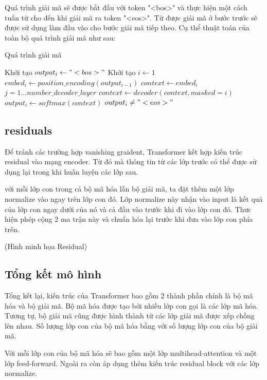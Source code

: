 Quá trình giải mã sẽ được bắt đầu với token "<bos>" và thực hiện một cách tuần từ cho đến khi giải mã ra token "<eos>". Từ được giải mã ở bước trước sẽ được sử dụng làm đầu vào cho bước giải mã tiếp theo. Cụ thể thuật toán của toàn bộ quá trình giải mã như sau:

\begin{algorithm}[H]
    \caption{Quá trình giải mã}
    \begin{algorithmic}[1]
		\State Khởi tạo $output_i \gets "<bos>"$
		\State Khởi tạo $i \gets 1$
		\Do
			\State $embed_i \gets position\_encoding(output_{i-1})$
			\State $context \gets embed_i$
			\For $j = 1...number\_decoder\_layer$
				\State $context \gets decoder(context, masked = i)$
			\EndFor
			\State $output_i \gets softmax(context)$
		\doWhile $output_i \neq "<eos>"$
    \end{algorithmic}
\end{algorithm}


\subsection{residuals}
Để tránh các trường hợp vanishing graident, Transformer kết hợp kiến trúc residual vào mạng encoder. Từ đó mà thông tin từ các lớp trước có thể được sử dụng lại trong khi huấn luyện các lớp sau.

với mỗi lớp con trong cả bộ mã hóa lẫn bộ giải mã, ta đặt thêm một lớp normalize vào ngay trên lớp con đó. Lớp normalize này nhận vào input là kết quả của lớp con ngay dưới của nó và cả đầu vào trước khi đi vào lớp con đó. Thưc hiện phép cộng 2 ma trận này và chuẩn hóa lại trước khi đưa vào lớp con phía trên.

(Hình minh họa Residual)


\subsection{Tổng kết mô hình}

Tổng kết lại, kiến trúc của Transformer bao gồm 2 thành phần chính là bộ mã hóa và bộ giải mã. Bộ mã hóa được tạo bởi nhiều lớp con gọi là các lớp mã hóa. Tương tự, bộ giải mã cũng được hình thành từ các lớp giải mã được xếp chồng lên nhau. Số lượng lớp con của bộ mã hóa bằng với số lượng lớp con của bộ giải mã.

Với mỗi lớp con của bộ mã hóa sẽ bao gồm một lớp multihead-attention và một lớp feed-forward. Ngoài ra còn áp dụng thêm kiến trúc residual block với các lớp normalize.

